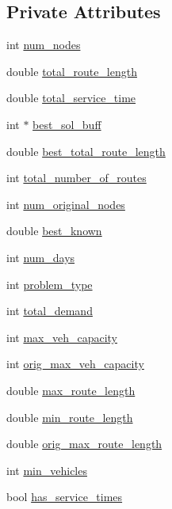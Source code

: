 \subsection*{Private Attributes}
\begin{DoxyCompactItemize}
\item 
int \hyperlink{class_v_r_p_a18aadb4711a9495b4f9c01d5ba839cde}{num\_\-nodes}
\item 
double \hyperlink{class_v_r_p_a4c206d5757a64335ad660ad03116c376}{total\_\-route\_\-length}
\item 
double \hyperlink{class_v_r_p_a8e6219158b959b07443ecee7508f820b}{total\_\-service\_\-time}
\item 
int $\ast$ \hyperlink{class_v_r_p_a3f3ca7d6c3a3c632c07750afa2b31b63}{best\_\-sol\_\-buff}
\item 
double \hyperlink{class_v_r_p_afd48775dd53edd84340f68f704b8f9dc}{best\_\-total\_\-route\_\-length}
\item 
int \hyperlink{class_v_r_p_aaf80fa84fe5d2641ecbd125b237a69fe}{total\_\-number\_\-of\_\-routes}
\item 
int \hyperlink{class_v_r_p_aba1d749c32b7c7f03b4223d4e824c67f}{num\_\-original\_\-nodes}
\item 
double \hyperlink{class_v_r_p_a8c1aea504be581f3d44cbe809343dd59}{best\_\-known}
\item 
int \hyperlink{class_v_r_p_aca4af6860b5f2e6f8b9d2d962bc08d92}{num\_\-days}
\item 
int \hyperlink{class_v_r_p_aa6eca2d600d3493057af43499619abf4}{problem\_\-type}
\item 
int \hyperlink{class_v_r_p_a65f10da2ba558e09769475bdcbb107de}{total\_\-demand}
\item 
int \hyperlink{class_v_r_p_ae6557cfbba614dc5d75567a7e0abf099}{max\_\-veh\_\-capacity}
\item 
int \hyperlink{class_v_r_p_a23ee0d0e34908651c27f2710d08b182d}{orig\_\-max\_\-veh\_\-capacity}
\item 
double \hyperlink{class_v_r_p_a8884ecddc6d2592162c012b284df672a}{max\_\-route\_\-length}
\item 
double \hyperlink{class_v_r_p_a4e20cf6dd60c29bd004d4160f93bdb98}{min\_\-route\_\-length}
\item 
double \hyperlink{class_v_r_p_a2697a8a76a766c0fec117719f719f402}{orig\_\-max\_\-route\_\-length}
\item 
int \hyperlink{class_v_r_p_ab48770e40f4f4ca52b032d6d1d33cde2}{min\_\-vehicles}
\item 
bool \hyperlink{class_v_r_p_aba36cee3f7c8bdc5f97ccf8b35c2e6d5}{has\_\-service\_\-times}

\end{DoxyCompactItemize}
